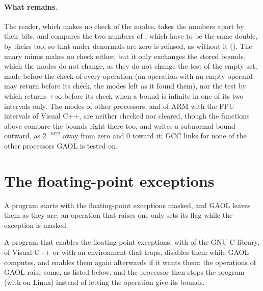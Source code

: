 \medskip
\paragraph{What remains.} The reader, which makes no check of the modes, takes
the numbers apart by their bits, and compares the two numbers of
, which have to be the same double, by theirs too,\newinvfive{}
so that under denormals-are-zero  is refused, as
without it (). The unary minus makes no check either,
but it only exchanges the stored bounds, which the modes do not change, as
they do not change the test of the empty set, made before the check of every
operation (an operation with an empty operand may return before its check,
the modes left as it found them), nor the test by which 
returns $+\infty$ before its check when a bound is infinite in one of its two
intervals only. The modes of other processors, and of ARM with the FPU
intervals of Visual C++, are neither checked nor cleared, though the
functions above compare the bounds right there too, and 
writes a subnormal bound outward, as $2^{-1022}$ away from zero and 0 toward
it; GCC links  for none of the other processors GAOL is
tested on.

\section{The floating-point exceptions}\label{sec:fp-exceptions}
%
%

A program starts with the floating-point exceptions masked, and GAOL leaves
them as they are: an operation that raises one only sets its flag while the
exception is masked.

\begin{Rem}\label{rem:fp-exceptions-enabled}
A program that enables the floating-point exceptions, with
 of the GNU C library,  of
Visual C++ or  with an environment that traps, disables
them while GAOL computes, and enables them again afterwards if it wants them: the
operations of GAOL raise some, as listed below, and the processor then stops
the program (with  on Linux) instead of letting the operation
give its bounds.\newinvfive
\end{Rem}

